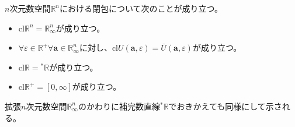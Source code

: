 \documentclass[dvipdfmx]{jsarticle}
\begin{document}
\begin{thm}\label{4.1.3.11}
$n$次元数空間$\mathbb{R}^{n}$における閉包について次のことが成り立つ。
\begin{itemize}
\item
  $\mathrm{cl}\mathbb{R}^{n} = \mathbb{R}_{\infty}^{n}$が成り立つ。
\item
  $\forall\varepsilon \in \mathbb{R}^{+}\forall\mathbf{a} \in \mathbb{R}_{\infty}^{n}$に対し、$\mathrm{cl}{U\left( \mathbf{a},\varepsilon \right)} = \overline{U}\left( \mathbf{a},\varepsilon \right)$が成り立つ。
\item
  $\mathrm{cl}\mathbb{R} ={}^{*}\mathbb{R}$が成り立つ。
\item
  $\mathrm{cl}\mathbb{R}^{+} = [ 0,\infty]$が成り立つ。
\end{itemize}
拡張$n$次元数空間$\mathbb{R}_{\infty}^{n}$のかわりに補完数直線${}^{*}\mathbb{R}$でおきかえても同様にして示される。
\end{thm}
\end{document}
